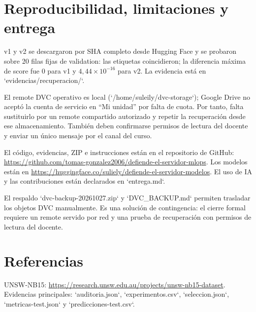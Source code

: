 \documentclass[10pt,a4paper]{article}
\begin{document}
\section{Reproducibilidad, limitaciones y entrega}
v1 y v2 se descargaron por SHA completo desde Hugging Face y se probaron sobre 20 filas fijas de validation: las etiquetas coincidieron; la diferencia máxima de score fue 0 para v1 y $4,44\times10^{-16}$ para v2. La evidencia está en `evidencias/recuperacion/`.

El remote DVC operativo es local (`/home/suleily/dvc-storage`); Google Drive no aceptó la cuenta de servicio en ``Mi unidad'' por falta de cuota. Por tanto, falta sustituirlo por un remote compartido autorizado y repetir la recuperación desde ese almacenamiento. También deben confirmarse permisos de lectura del docente y enviar un único mensaje por el canal del curso.

El código, evidencias, ZIP e instrucciones están en el repositorio de GitHub: \url{https://github.com/tomas-gonzalez2006/defiende-el-servidor-mlops}. Los modelos están en \url{https://huggingface.co/suliely/defiende-el-servidor-modelos}. El uso de IA y las contribuciones están declarados en `entrega.md`.

El respaldo `dvc-backup-20261027.zip` y `DVC_BACKUP.md` permiten trasladar los objetos DVC manualmente. Es una solución de contingencia: el cierre formal requiere un remote servido por red y una prueba de recuperación con permisos de lectura del docente.

\section*{Referencias}
UNSW-NB15: \url{https://research.unsw.edu.au/projects/unsw-nb15-dataset}. Evidencias principales: `auditoria.json`, `experimentos.csv`, `seleccion.json`, `metricas-test.json` y `predicciones-test.csv`.
\end{document}
